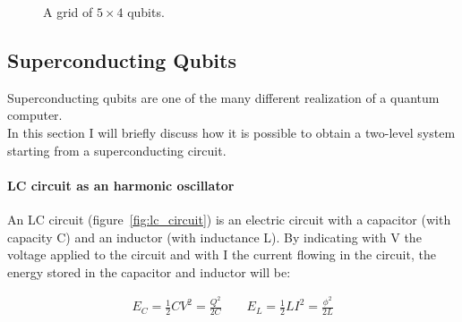 \begin{figure}[ht]
\centering
{}
\caption{A grid of $5 \times 4$ qubits.}
\label{fig:quantum_grid}
\end{figure}



\subsection{Superconducting Qubits}

Superconducting qubits are one of the many different realization of a quantum computer.\\
In this section I will briefly discuss how it is possible to obtain a two-level system starting from a superconducting circuit.

\paragraph*{LC circuit as an harmonic oscillator}

An LC circuit (figure~\ref{fig:lc_circuit}) is an electric circuit with a capacitor (with capacity C) and an inductor (with inductance L).
By indicating with V the voltage applied to the circuit and with I the current flowing in the circuit, the energy stored in the capacitor and
inductor will be:

\begin{align}
    E_C = \frac{1}{2}CV^2 = \frac{Q^2}{2C}
    \qquad
    E_L = \frac{1}{2}LI^2 = \frac{\phi^2}{2L}
\end{align}

